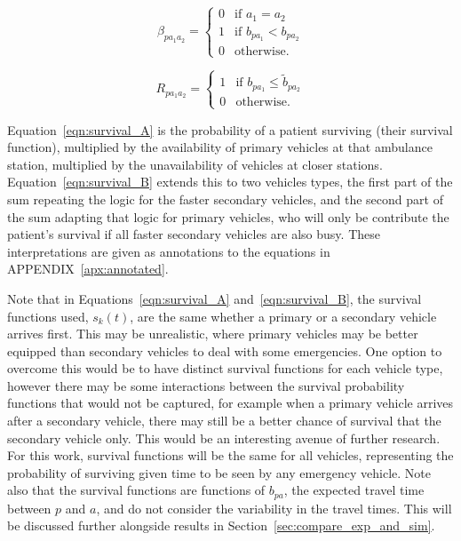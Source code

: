 \documentclass[numbers,webpdf,imaman]{ima-authoring-template}%
\begin{document}
\begin{equation}\label{eqn:beta}
\beta_{p a_1 a_2} = \begin{cases}
    0 & \text{if } a_1 = a_2\\
    1 & \text{if } b_{p a_1} < b_{p a_2}\\
    0 & \text{otherwise.}
\end{cases}
\end{equation}

\begin{equation}\label{eqn:R}
R_{p a_1 a_2} = \begin{cases}
    1 & \text{if } b_{p a_1} \leq \tilde{b}_{p a_2}\\
    0 & \text{otherwise.}
\end{cases}
\end{equation}

Equation~\ref{eqn:survival_A} is the probability of a patient surviving (their
survival function), multiplied by the availability of primary vehicles at that
ambulance station, multiplied by the unavailability of vehicles at closer
stations.
Equation~\ref{eqn:survival_B} extends this to two vehicles types, the first
part of the sum repeating the logic for the faster secondary vehicles, and the
second part of the sum adapting that logic for primary vehicles, who will only
be contribute the patient's survival if all faster secondary vehicles are also
busy. These interpretations are given as annotations to the equations
in APPENDIX~\ref{apx:annotated}.

Note that in Equations~\ref{eqn:survival_A}
and~\ref{eqn:survival_B}, the survival functions used, $s_k(t)$, are the same
whether a primary or a secondary vehicle arrives first. This may be unrealistic,
where primary vehicles may be better equipped than secondary vehicles to deal
with some emergencies. One option to overcome this would be to have distinct
survival functions for each vehicle type, however there may be some interactions
between the survival probability functions that would not be captured, for
example when a primary vehicle arrives after a secondary vehicle, there may
still be a better chance of survival that the secondary vehicle only. This would
be an interesting avenue of further research. For this work, survival functions
will be the same for all vehicles, representing the probability of surviving
given time to be seen by any emergency vehicle.
Note also that the survival functions are functions of $b_{pa}$, the expected
travel time between $p$ and $a$, and do not consider the variability in the
travel times. This will be discussed further alongside results in
Section~\ref{sec:compare_exp_and_sim}.
\end{document}
